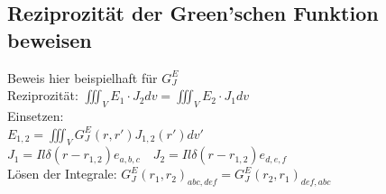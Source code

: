 \documentclass[english]{latex4ei/latex4ei_sheet}
\begin{document}
\begin{sectionbox}
	\subsection{Reziprozität der Green'schen Funktion beweisen}
	Beweis hier beispielhaft für $G_J^E$\\
	Reziprozität: $\iiint_V E_1\cdot J_2 dv = \iiint_V E_2\cdot J_1 dv$\\
	Einsetzen:\\
	$E_{1,2} = \iiint_V G_J^E(r,r') J_{1,2}(r') dv'$\\
	$J_{1} = Il \delta(r-r_{1,2})e_{a,b,c}\quad J_{2} = Il \delta(r-r_{1,2})e_{d,e,f}$\\
	Lösen der Integrale: $G_J^E(r_1,r_2)_{abc,def} = G_J^E(r_2,r_1)_{def,abc}$
\end{sectionbox}
\end{document}
